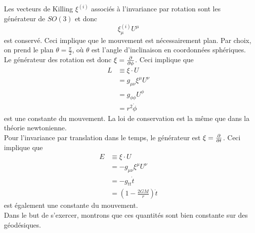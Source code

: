 \documentclass[a4paper,11pt]{report}
\begin{document}
            Les vecteurs de Killing $\xi^{(i)}$ associés à l'invariance par rotation sont les générateur de $SO(3)$ et donc
            \begin{equation}
                \xi^{(i)}_\mu U^\mu
            \end{equation}
            est conservé. Ceci implique que le mouvement est nécessairement plan. Par choix, on prend le plan $\theta = \frac{\pi}{2}$, où $\theta$ est l'angle d'inclinaison en coordonnées sphériques. Le générateur des rotation est donc $\xi = \pdv{}{\phi}$. Ceci implique que
            \begin{align}
                L &\equiv \xi\cdot U \\
                &= g_{\mu\nu}\xi^\mu U^\nu\\
                &= g_{\phi\phi} U^\phi\\
                &= r^2\dot{\phi}
            \end{align}
            est une constante du mouvement. La loi de conservation est la même que dans la théorie newtonienne.\\
            
            Pour l'invariance par translation dans le temps, le générateur est $\xi = \pdv{}{t}$. Ceci implique que 
            \begin{align}
                E &\equiv \xi\cdot U\\
                &= -g_{\mu\nu}\xi^\mu U^\nu\\
                &= -g_{tt}\dot{t}\\
                &= \left( 1-\frac{2GM}{r} \right)\dot{t}
            \end{align}
            est également une constante du mouvement.\\
            
            Dans le but de s'exercer, montrons que ces quantités sont bien constante sur des géodésiques. 
            \comp
            
\end{document}
